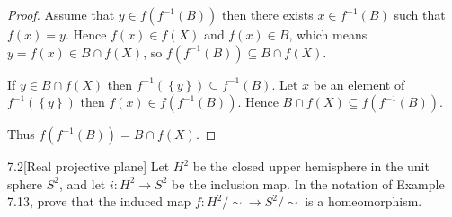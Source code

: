 \begin{proof}
    Assume that \( y \in f(f^{-1}(B)) \) then there exists \( x \in f^{-1}(B) \) such that \( f(x) = y \). Hence \( f(x) \in f(X) \) and \( f(x) \in B \), which means \( y = f(x) \in B \cap f(X) \), so \( f(f^{-1}(B)) \subseteq B \cap f(X) \).

    If \( y \in B \cap f(X) \) then \( f^{-1}(\left\{ y \right\}) \subseteq f^{-1}(B)\). Let \( x \) be an element of \( f^{-1}(\left\{ y \right\}) \) then \( f(x) \in f(f^{-1}(B)) \). Hence \( B \cap f(X) \subseteq f(f^{-1}(B)) \).

    Thus \( f(f^{-1}(B)) = B \cap f(X) \).
\end{proof}

\begin{problem}{7.2}[Real projective plane]
Let \( H^{2} \) be the closed upper hemisphere in the unit sphere \( S^{2} \), and let \( i: H^{2} \to S^{2} \) be the inclusion map. In the notation of Example 7.13, prove that the induced map \( f: H^{2}/\!\sim \to S^{2}/\!\sim \) is a homeomorphism.
\end{problem}

